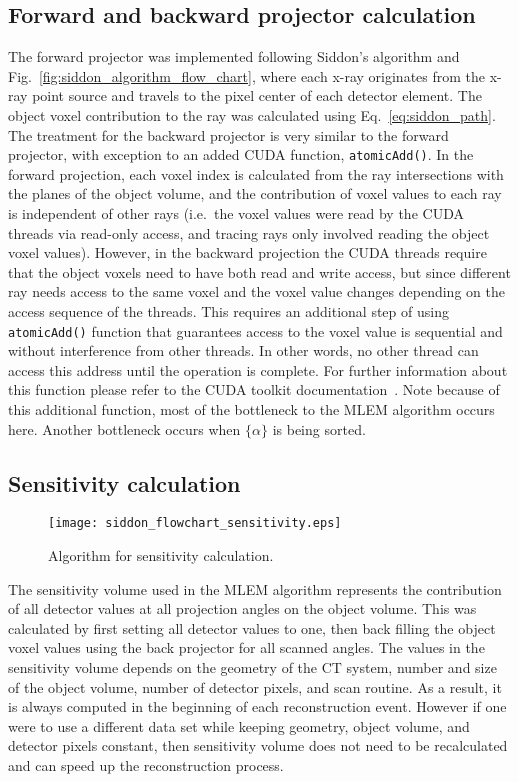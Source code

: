 \subsection{Forward and backward projector calculation}
The forward projector was implemented following Siddon's algorithm and Fig.~\ref{fig:siddon_algorithm_flow_chart}, where each x-ray originates from the x-ray point source and travels to the pixel center of each detector element.  The object voxel contribution to the ray was calculated using Eq.~\ref{eq:siddon_path}.  The treatment for the backward projector is very similar to the forward projector, with exception to an added CUDA function, \texttt{atomicAdd()}.  In the forward projection, each voxel index is calculated from the ray intersections with the planes of the object volume, and the contribution of voxel values to each ray is independent of other rays (i.e.\ the voxel values were read by the CUDA threads via read-only access, and tracing rays only involved reading the object voxel values).  However, in the backward projection the CUDA threads require that the object voxels need to have both read and write access, but since different ray needs access to the same voxel and the voxel value changes depending on the access sequence of the threads.  This requires an additional step of using \texttt{atomicAdd()} function that guarantees access to the voxel value is sequential and without interference from other threads.  In other words, no other thread can access this address until the operation is complete.  For further information about this function please refer to the CUDA toolkit documentation~\citep{Cudatoolkit}.  Note because of this additional function, most of the bottleneck to the MLEM algorithm occurs here.  Another bottleneck occurs when $\{ \alpha \}$ is being sorted.

\subsection{Sensitivity calculation}

\begin{figure}[h]
\centering
\texttt{[image: siddon\_flowchart\_sensitivity.eps]}
\caption{Algorithm for sensitivity calculation.}
\label{fig:sensitivityslices}
\end{figure}

The sensitivity volume used in the MLEM algorithm represents the contribution of all detector values at all projection angles on the object volume.  This was calculated by first setting all detector values to one, then back filling the object voxel values using the back projector for all scanned angles.  The values in the sensitivity volume depends on the geometry of the CT system, number and size of the object volume, number of detector pixels, and scan routine.  As a result, it is always computed in the beginning of each reconstruction event.  However if one were to use a different data set while keeping geometry, object volume, and detector pixels constant, then sensitivity volume does not need to be recalculated and can speed up the reconstruction process.

